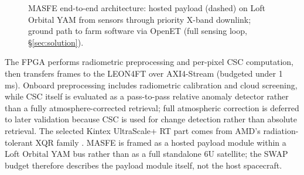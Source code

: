 \documentclass[11pt,letterpaper]{article}
\begin{document}
\begin{figure}[!htbp]
  \begingroup
  \captionsetup{font=normalsize,labelfont=bf}
  \caption{MASFE end-to-end architecture: hosted payload (dashed) on Loft Orbital YAM from sensors through priority X-band downlink; ground path to farm software via OpenET (full sensing loop, \S\ref{sec:solution}).}
  \label{fig:architecture}
  \endgroup
  \end{figure}

The FPGA performs radiometric preprocessing and per-pixel CSC computation, then transfers frames to the LEON4FT over AXI4-Stream (budgeted under 1 ms). Onboard preprocessing includes radiometric calibration and cloud screening, while CSC itself is evaluated as a pass-to-pass relative anomaly detector rather than a fully atmosphere-corrected retrieval; full atmospheric correction is deferred to later validation because CSC is used for change detection rather than absolute retrieval. The selected Kintex UltraScale+ RT part comes from AMD's radiation-tolerant XQR family \cite{amd-xqr}. MASFE is framed as a hosted payload module within a Loft Orbital YAM bus rather than as a full standalone 6U satellite; the SWAP budget therefore describes the payload module itself, not the host spacecraft.
\end{document}
